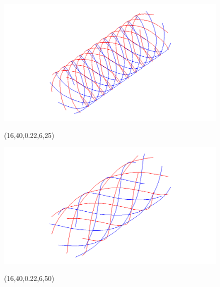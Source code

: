\begin{figure} [H]
   \centering
   \begin{makeimage}
   \end{makeimage}
   \begin{latexonly}
	\hspace{0.1cm}
	\begin{minipage} [c] [] [c]{5.5cm} 
	\includegraphics [width =\textwidth] {images/WireStentD16L40d22n6b25}
	\begin{center}
	\vspace{-3ex}
	(16,40,0.22,6,25)
	\vspace{1ex}
	\end{center}
\end{minipage}
\hspace{0.3cm}
\begin{minipage} [c] [] [c] {5.5cm}
	\includegraphics [width =\textwidth] {images/WireStentD16L40d22n6b50}
	\begin{center}
	\vspace{-3ex}
	(16,40,0.22,6,50)
	\vspace{1ex}
	\end{center}

\end{minipage}
\end{latexonly}
\end{figure}
